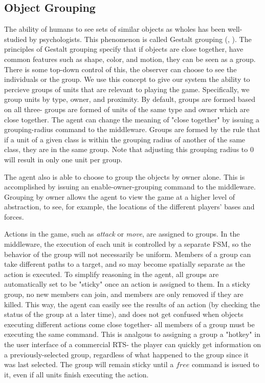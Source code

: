 \subsection{Object Grouping}

The ability of humans to see sets of similar objects as wholes has been well-studied by psychologists. This phenomenon is called Gestalt grouping (\cite{hill99modeling}, \cite{Kubovy1998}). The principles of Gestalt grouping specify that if objects are close together, have common features such as shape, color, and motion, they can be seen as a group. There is some top-down control of this, the observer can choose to see the individuals or the group. We use this concept to give our system the ability to percieve groups of units that are relevant to playing the game. Specifically, we group units by type, owner, and proximity. By default, groups are formed based on all three- groups are formed of units of the same type and owner which are close together. The agent can change the meaning of "close together" by issuing a grouping-radius command to the middleware. Groups are formed by the rule that if a unit of a given class is within the grouping radius of another of the same class, they are in the same group. Note that adjusting this grouping radius to 0 will result in only one unit per group.

The agent also is able to choose to group the objects by owner alone. This is accomplished by issuing an enable-owner-grouping command to the middleware. Grouping by owner allows the agent to view the game at a higher level of abstraction, to see, for example, the locations of the different players' bases and forces.

Actions in the game, such as {\it attack} or {\it move}, are assigned to groups. In the middleware, the execution of each unit is controlled by a separate FSM, so the behavior of the group will not necessarily be uniform. Members of a group can take different paths to a target, and so may become spatially separate as the action is executed. To simplify reasoning in the agent, all groups are automatically set to be "sticky" once an action is assigned to them. In a sticky group, no new members can join, and members are only removed if they are killed. This way, the agent can easily see the results of an action (by checking the status of the group at a later time), and does not get confused when objects executing different actions come close together- all members of a group must be executing the same command. This is analgous to assigning a group a "hotkey" in the user interface of a commercial RTS- the player can quickly get information on a previously-selected group, regardless of what happened to the group since it was last selected. The group will remain sticky until a $free$ command is issued to it, even if all units finish executing the action.


